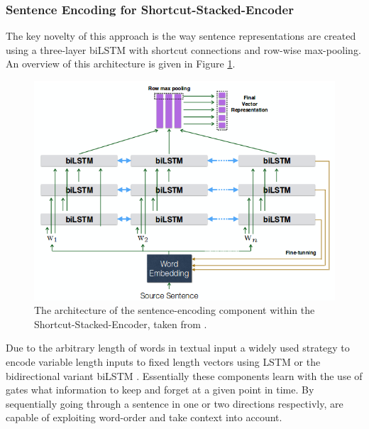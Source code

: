 \subsubsection{Sentence Encoding for Shortcut-Stacked-Encoder}
The key novelty of this approach is the way sentence representations are created using a three-layer \ac{biLSTM} with shortcut connections and row-wise max-pooling. An overview of this architecture is given in Figure \ref{fig:sentence_emcoder_shortcut}.
\begin{figure}[tph!]
\centering
	\includegraphics[totalheight=8cm]{fig/sentence_encoder_shortcut.png}
	\caption{The architecture of the sentence-encoding component within the Shortcut-Stacked-Encoder, taken from \cite{nie2017shortcut}.}
	\label{fig:sentence_emcoder_shortcut}
\end{figure}
Due to the arbitrary length of words in textual input a widely used strategy to encode variable length inputs to fixed length vectors using \ac{LSTM} \citep{hochreiter1997long} or the bidirectional variant \ac{biLSTM} \citep{graves2005framewise}. Essentially these components learn with the use of gates what information to keep and forget at a given point in time. By sequentially going through a sentence in one or two directions respectivly, are capable of exploiting word-order and take context into account.
\newline

